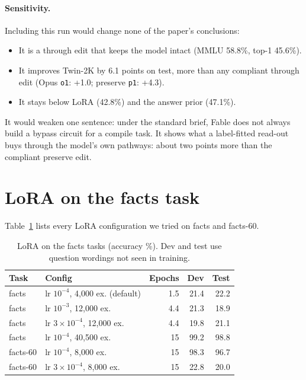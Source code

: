 \paragraph{Sensitivity.} Including this run would change none of the paper's conclusions:
\begin{itemize}
  \item It is a through edit that keeps the model intact (MMLU 58.8\%, top-1 45.6\%).
  \item It improves Twin-2K by 6.1 points on test, more than any compliant through edit (Opus \texttt{o1}: +1.0; preserve \texttt{p1}: +4.3).
  \item It stays below LoRA (42.8\%) and the answer prior (47.1\%).
\end{itemize}
It would weaken one sentence: under the standard brief, Fable does not always build a bypass circuit for a compile task. It shows what a label-fitted read-out buys through the model's own pathways: about two points more than the compliant preserve edit.

\begin{table}[h]
\centering\small
\resizebox{\linewidth}{!}{}
\caption{Runs excluded from the main comparison for breaking the brief (Qwen, accuracy \%). Columns as in Table~\ref{tab:side}; \emph{Other task} is SST-5 dev (unedited 42.3).}
\label{tab:deviations}
\end{table}

\section{LoRA on the facts task}
\label{app:facts-lora}
Table~\ref{tab:facts-lora} lists every LoRA configuration we tried on facts and facts-60.
\begin{table}[h]
\centering\small
\begin{tabular}{llrrr}
\toprule
Task & Config & Epochs & Dev & Test \\
\midrule
facts & lr $10^{-4}$, 4,000 ex. (default) & 1.5 & 21.4 & 22.2 \\
facts & lr $10^{-3}$, 12,000 ex. & 4.4 & 21.3 & 18.9 \\
facts & lr $3\times10^{-4}$, 12,000 ex. & 4.4 & 19.8 & 21.1 \\
facts & lr $10^{-4}$, 40,500 ex. & 15 & 99.2 & 98.8 \\
facts-60 & lr $10^{-4}$, 8,000 ex. & 15 & 98.3 & 96.7 \\
facts-60 & lr $3\times10^{-4}$, 8,000 ex. & 15 & 22.8 & 20.0 \\
\bottomrule
\end{tabular}
\caption{LoRA on the facts tasks (accuracy \%). Dev and test use question wordings not seen in training.}
\label{tab:facts-lora}
\end{table}

